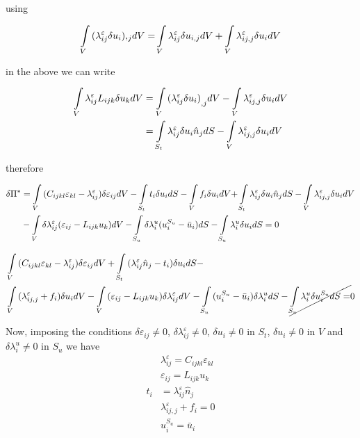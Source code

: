 using

\[\int\limits_V {(\lambda _{ij}^\varepsilon \delta {u_i}){,_j}dV = } \int\limits_V {\lambda _{ij}^\varepsilon \delta {u_{i,j}}dV}  + \int\limits_V {\lambda _{ij,j}^\varepsilon \delta {u_i}dV} \]

in the above we can write

\begin{align*}
\int\limits_V {\lambda _{ij}^\varepsilon {L_{ijk}}\delta {u_k}dV} & = \int\limits_V {{{(\lambda _{ij}^\varepsilon \delta {u_i})}_{,j}}dV}  - \int\limits_V {\lambda _{ij,j}^\varepsilon \delta {u_i}dV}\\
& = \int\limits_{{S_t}} {\lambda _{ij}^\varepsilon \delta {u_i}{{\hat n}_j}dS}  - \int\limits_V {\lambda _{ij,j}^\varepsilon \delta {u_i}dV}
\end{align*}

therefore


\begin{align*}
\delta \Pi^* &= \int\limits_V {({C_{ijkl}}{\varepsilon _{kl}} - \lambda _{ij}^\varepsilon )\delta {\varepsilon _{ij}}dV - \int\limits_{{S_t}} {{t_i}\delta {u_i}dS}  - \int\limits_V {{f_i}\delta {u_i}dV + } } \int\limits_{{S_t}} {\lambda _{ij}^\varepsilon \delta {u_i}{{\hat n}_j}dS}  - \int\limits_V {\lambda _{ij,j}^\varepsilon \delta {u_i}dV}\\
&- \int\limits_V {\delta \lambda _{ij}^\varepsilon ({\varepsilon _{ij}} - {L_{ijk}}{u_k})dV}  - \int\limits_{{S_u}} {\delta \lambda _i^u(u_i^{{S_u}} - {{\bar u}_i})dS}  - \int\limits_{{S_u}} {\lambda _i^u\delta {u_i}dS}  = 0
\end{align*}


\begin{align*}
&\int\limits_V {({C_{ijkl}}{\varepsilon _{kl}} - \lambda _{ij}^\varepsilon )\delta {\varepsilon _{ij}}dV
+ \int\limits_{{S_t}} {(\lambda _{ij}^\varepsilon {{\hat n}_j} - {t_i})\delta {u_i}dS}  - }\\
&\int\limits_V {(\lambda _{ij,j}^\varepsilon  + {f_i})\delta {u_i}dV}
- \int\limits_V {({\varepsilon _{ij}} - {L_{ijk}}{u_k})\delta \lambda _{ij}^\varepsilon dV}
- \int\limits_{{S_u}} {(u_i^{{S_u}} - {{\bar u}_i})\delta \lambda _i^udS}  - \cancel{\int\limits_{{S_u}} {\lambda _i^u\delta u_i^{{S_u}}dS} = } 0
\end{align*}


Now, imposing the conditions $\delta {\varepsilon _{ij}} \neq 0$, $\delta \lambda _{ij}^\varepsilon  \neq 0$, $\delta {u_i} \neq 0$ in $S_t$, $\delta {u_i} \neq 0$ in $V$ and $\delta \lambda _i^u \neq 0$ in $S_u$ we have
%
\begin{align}
&\lambda _{ij}^\varepsilon  = C_{ijkl} \varepsilon_{kl}\\
&\varepsilon_{ij} = {L_{ijk}}{u_k}\\
t_i &= \lambda_{ij}^\varepsilon \hat{n}_j\\
&\lambda _{ij,j}^\varepsilon  + {f_i} = 0\\
&u_i^{S_u} = \bar{u}_i
\end{align}

